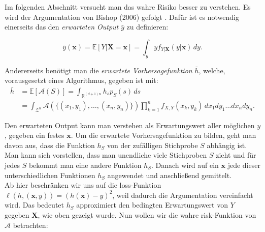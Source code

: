 Im folgenden Abschnitt versucht man das wahre Risiko besser zu verstehen. Es wird der Argumentation von Bishop (2006) gefolgt \cite[Seiten 147 bis 152]{bishop}.
Daf\"ur ist es notwendig einerseits das den \textit{erwarteten Output} $\bar{y}$ zu definieren:

$$ \bar{y}(\mathbf{x}) = \mathbb{E}[Y|\mathbf{X}=\mathbf{x}] = \int_y y f_{Y|\mathbf{X}}(y|\mathbf{x}) \, dy.$$

Andererseits ben\"otigt man die \textit{erwartete Vorhersagefunktion} $\bar{h}$, welche, vorausgesetzt eines Algorithmus, gegeben ist mit:
\begin{equation*}
  \begin{split}
    \bar{h} & = \mathbb{E}[\mathcal{A}(S)] = \int_{\mathbb{R}^{(d+1)n}} h_s p_S(s)  \,ds  \\\
    & = \int_{\mathcal{Z}^n}\mathcal{A}(\{ (x_1, y_1), \dots ,(x_n, y_n)\}) \prod_{k=1}^n f_{X,Y}(x_k, y_k) \, dx_1 dy_1 \dots dx_n dy_n.
  \end{split}
\end{equation*}


Den erwarteten Output kann man verstehen als Erwartungswert aller m\"oglichen $y$, gegeben ein festes $\mathbf{x}$. 
Um die erwartete Vorhersagefunktion zu bilden, geht man davon aus, dass 
die Funktion $h_S$ von der zuf\"alligen Stichprobe $S$ abh\"angig ist. Man kann sich vorstellen, dass man unendliche viele Stichproben $S$ zieht und 
f\"ur jedes $S$ bekommt man eine andere Funktion $h_S$. Danach wird auf ein $\mathbf{x}$ jede dieser unterschiedlichen Funktionen $h_S$ angewendet und 
anschlie{\ss}end gemittelt. \\


Ab hier beschr\"anken wir uns auf die loss-Funktion $ \ell(h, (\mathbf{x},y)) = (h(\mathbf{x}) - y)^2 $, weil dadurch die Argumentation vereinfacht wird. 
Das bedeutet $h_S$ approximiert den bedingten Erwartungswert von 
$Y$ gegeben $\mathbf{X}$, wie oben gezeigt wurde. Nun wollen wir die wahre risk-Funktion von $\mathcal{A}$ betrachten:


